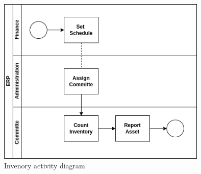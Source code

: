 
\begin{figure}[!h]
\label{login_activity_diagram}
\center
\includegraphics[width=10cm,keepaspectratio]{activity_diagrams/manage_inventory_activity_diagram.drawio.png}
\caption{Invenory activity diagram}
\end{figure}

